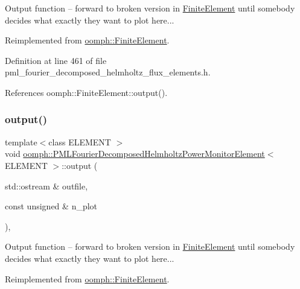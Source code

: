 Output function -- forward to broken version in \hyperlink{classoomph_1_1FiniteElement}{Finite\+Element} until somebody decides what exactly they want to plot here... 

Reimplemented from \hyperlink{classoomph_1_1FiniteElement_a2ad98a3d2ef4999f1bef62c0ff13f2a7}{oomph\+::\+Finite\+Element}.



Definition at line 461 of file pml\+\_\+fourier\+\_\+decomposed\+\_\+helmholtz\+\_\+flux\+\_\+elements.\+h.



References oomph\+::\+Finite\+Element\+::output().

\mbox{\label{classoomph_1_1PMLFourierDecomposedHelmholtzPowerMonitorElement_a69d1d0e4362c38aa9e6f258af37f0bf4}} 
\subsubsection{\texorpdfstring{output()}{output()}\hspace{0.1cm}{\footnotesize\ttfamily [2/4]}}
{\footnotesize\ttfamily template$<$class E\+L\+E\+M\+E\+NT $>$ \\
void \hyperlink{classoomph_1_1PMLFourierDecomposedHelmholtzPowerMonitorElement}{oomph\+::\+P\+M\+L\+Fourier\+Decomposed\+Helmholtz\+Power\+Monitor\+Element}$<$ E\+L\+E\+M\+E\+NT $>$\+::output (\begin{DoxyParamCaption}\item[{std\+::ostream \&}]{outfile,  }\item[{const unsigned \&}]{n\+\_\+plot }\end{DoxyParamCaption})\hspace{0.3cm}{\ttfamily [inline]}, {\ttfamily [virtual]}}



Output function -- forward to broken version in \hyperlink{classoomph_1_1FiniteElement}{Finite\+Element} until somebody decides what exactly they want to plot here... 



Reimplemented from \hyperlink{classoomph_1_1FiniteElement_afa9d9b2670f999b43e6679c9dd28c457}{oomph\+::\+Finite\+Element}.



